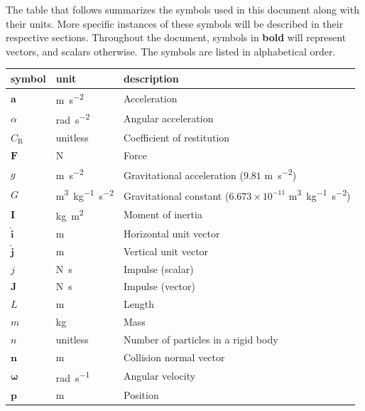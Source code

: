 \documentclass[12pt]{article}
\begin{document}

The table that follows summarizes the symbols used in this document along with
their units. More specific instances of these symbols will be described in their respective sections. Throughout the document, symbols in \textbf{bold} will represent vectors, and scalars otherwise. The symbols are listed in alphabetical order.

\renewcommand{\arraystretch}{1.2}
\noindent \begin{longtable}{l l p{12cm}} \toprule
  \textbf{symbol} & \textbf{unit} & \textbf{description}\\
  \midrule 
  $\mathbf{a}$ & \si{\metre\per\second\tothe{2}} & Acceleration \\
  $\alpha$ & \si{\radian\per\second\tothe{2}} & Angular acceleration \\
  $C_\text{R}$ & unitless & Coefficient of restitution \\
  $\mathbf{F}$ & \si{\newton} & Force \\
  $g$ & \si{\metre\per\second\tothe{2}} & Gravitational acceleration ($9.81$ \si{\metre\per\second\tothe{2}}) \\
  $G$ & \si{\metre\tothe{3}\per\kilogram\second\tothe{-2}} & Gravitational constant ($6.673 \times 10^{-11}$ \si{\metre\tothe{3}\per\kilogram\second\tothe{-2}}) \\
  $\mathbf{I}$ & \si{\kilogram\metre\tothe{2}} & Moment of inertia \\
  $\mathbf{\hat{i}}$ & \si{\metre} & Horizontal unit vector \\
  $\mathbf{\hat{j}}$ & \si{\metre} & Vertical unit vector \\
  $j$ & \si{\newton\second} & Impulse (scalar) \\
  $\mathbf{J}$ & \si{\newton\second} & Impulse (vector) \\
  $L$ & \si{\metre} & Length \\
  $m$ & \si{\kilogram} & Mass \\
  $n$ & unitless & Number of particles in a rigid body \\
  $\mathbf{n}$ & \si{\metre} & Collision normal vector \\
  $\boldsymbol{\omega}$ & \si{\radian\per\second} & Angular velocity \\
  $\mathbf{p}$ & \si{\metre} & Position \\

\end{longtable}
\end{document}

